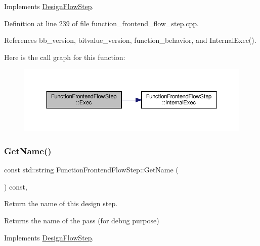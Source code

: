 Implements \hyperlink{classDesignFlowStep_a77d7e38493016766098711ea24f60b89}{Design\+Flow\+Step}.



Definition at line 239 of file function\+\_\+frontend\+\_\+flow\+\_\+step.\+cpp.



References bb\+\_\+version, bitvalue\+\_\+version, function\+\_\+behavior, and Internal\+Exec().

Here is the call graph for this function\+:
\nopagebreak
\begin{figure}[H]
\begin{center}
\leavevmode
\includegraphics[width=350pt]{d8/d0a/classFunctionFrontendFlowStep_a4ee2aae4089ec112f2236c0b08a854bb_cgraph}
\end{center}
\end{figure}
\mbox{\label{classFunctionFrontendFlowStep_add9013c4bc46fe7e932151ca5b902d32}} 
\subsubsection{\texorpdfstring{Get\+Name()}{GetName()}}
{\footnotesize\ttfamily const std\+::string Function\+Frontend\+Flow\+Step\+::\+Get\+Name (\begin{DoxyParamCaption}{ }\end{DoxyParamCaption}) const\hspace{0.3cm}{\ttfamily [override]}, {\ttfamily [virtual]}}



Return the name of this design step. 

\begin{DoxyReturn}{Returns}
the name of the pass (for debug purpose) 
\end{DoxyReturn}


Implements \hyperlink{classDesignFlowStep_a01e5ebfab88db3b3b7f832f80075fad8}{Design\+Flow\+Step}.



